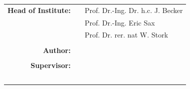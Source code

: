 \begin{titlepage}
\begin{minipage}{15cm}
\begin{center}
\vspace{0.5cm}
\Large
\abgabe
\end{center}
%
\vspace{2.5cm}

\begin{tabular}{rcl}
\bfseries Head of Institute: 
&& Prof. Dr.-Ing. Dr. h.c. J. Becker\\
&& Prof. Dr.-Ing. Eric Sax\\
&& Prof. Dr. rer. nat  W. Stork\\

 \\
	\bfseries Author:         && \nameprefix \  \docauthor \\

 \\
	\bfseries Supervisor:       &&\nameprefixa \  \betreuerA \\
											      && \nameprefixb \  \betreuerB \\
\end{tabular}											
\end{minipage}
\end{titlepage}